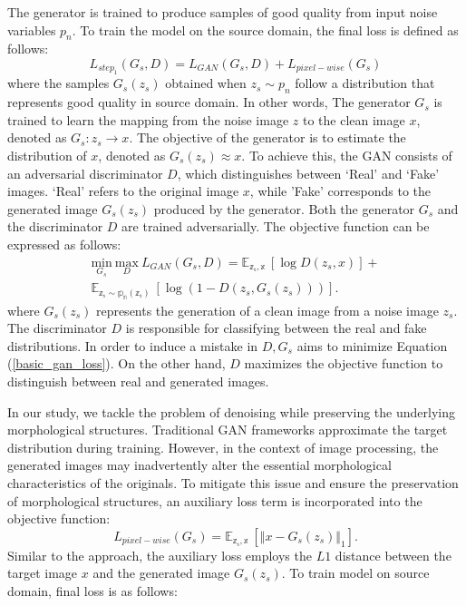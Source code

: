 \documentclass[lettersize,journal]{IEEEtran}
\begin{document}
The generator is trained to produce samples of good quality from input noise variables $p_n$. To train the model on the source domain, the final loss is defined as follows:
\begin{equation}
\label{pre_training_final_loss}
L_{step_1}(G_s,D) = L_{GAN}(G_s,D) + L_{pixel-wise}(G_s)
\end{equation}
where the samples $G_s(z_s)$ obtained when $z_s \sim p_n$ follow a distribution that represents good quality in source domain. In other words, The generator $G_s$ is trained to learn the mapping from the noise image $z$ to the clean image $x$, denoted as $G_s:z_s \rightarrow x$. The objective of the generator is to estimate the distribution of $x$, denoted as $G_s(z_s) \approx x$. To achieve this, the GAN consists of an adversarial discriminator $D$, which distinguishes between `Real' and `Fake' images. `Real' refers to the original image $x$, while 'Fake' corresponds to the generated image $G_s(z_s)$ produced by the generator. Both the generator $G_s$ and the discriminator $D$ are trained adversarially. The objective function can be expressed as follows:
\begin{multline}
\label{basic_gan_loss}
\underset {G_s} {\text{min}} \ \underset {D} {\text{max}} \ L_{GAN}(G_s,D) = \mathbb{E_{\text{$z_s, x$}}} \ [\log{D(z_s,x)}] + \\ \mathbb{E_{\text{$z_s\sim p_n(z_s)$}}} \ [\log{(1-D(z_s,G_s(z_s)))}].
\end{multline}
where $G_s(z_s)$ represents the generation of a clean image from a noise image $z_s$. The discriminator $D$ is responsible for classifying between the real and fake distributions. In order to induce a mistake in $D, G_s$ aims to minimize Equation (\ref{basic_gan_loss}). On the other hand, $D$ maximizes the objective function to distinguish between real and generated images. 

In our study, we tackle the problem of denoising while preserving the underlying morphological structures. Traditional GAN \cite{goodfellow2020generative} frameworks approximate the target distribution during training. However, in the context of image processing, the generated images may inadvertently alter the essential morphological characteristics of the originals\cite{isola2017image,zhang2019noise,park2022unpaired}. To mitigate this issue and ensure the preservation of morphological structures, an auxiliary loss term is incorporated into the objective function:
\begin{equation}
\label{L_pixel-wise}
L_{pixel-wise}(G_s) = \mathbb{E_{\text{$z_s,x$}}} \ [\Vert{x-G_s(z_s)}{\Vert}_1].
\end{equation}
Similar to the \cite{isola2017image} approach, the auxiliary loss employs the $L1$ distance between the target image $x$ and the generated image $G_s(z_s)$. To train model on source domain, final loss is as follows:
\end{document}
